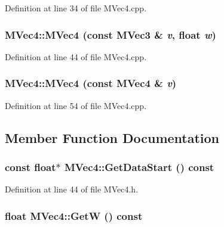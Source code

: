 Definition at line 34 of file MVec4.cpp.\hypertarget{class_m_vec4_d0b73fac9c63679a567eee1dcacbb47f}{
\subsubsection[{MVec4}]{\setlength{\rightskip}{0pt plus 5cm}MVec4::MVec4 (const {\bf MVec3} \& {\em v}, \/  float {\em w})}}
\label{class_m_vec4_d0b73fac9c63679a567eee1dcacbb47f}




Definition at line 44 of file MVec4.cpp.\hypertarget{class_m_vec4_af4fbbbfafe3fa744904ffd3a00aaebd}{
\subsubsection[{MVec4}]{\setlength{\rightskip}{0pt plus 5cm}MVec4::MVec4 (const {\bf MVec4} \& {\em v})}}
\label{class_m_vec4_af4fbbbfafe3fa744904ffd3a00aaebd}




Definition at line 54 of file MVec4.cpp.

\subsection{Member Function Documentation}
\hypertarget{class_m_vec4_bf21855162ebbca26c8464f7d0f84cf0}{
\subsubsection[{GetDataStart}]{\setlength{\rightskip}{0pt plus 5cm}const float$\ast$ MVec4::GetDataStart () const}}
\label{class_m_vec4_bf21855162ebbca26c8464f7d0f84cf0}




Definition at line 44 of file MVec4.h.\hypertarget{class_m_vec4_91b1c6b8b433967179c18355ef885d7b}{
\subsubsection[{GetW}]{\setlength{\rightskip}{0pt plus 5cm}float MVec4::GetW () const}}
\label{class_m_vec4_91b1c6b8b433967179c18355ef885d7b}




